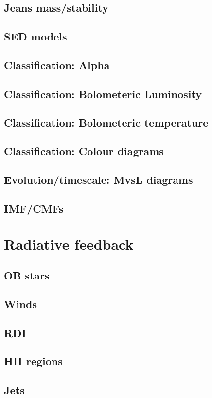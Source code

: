 \subsection{Jeans mass/stability}
\subsection{SED models}
\subsection{Classification: Alpha}
\subsection{Classification: Bolometeric Luminosity}
\subsection{Classification: Bolometeric temperature}
\subsection{Classification: Colour diagrams}
\subsection{Evolution/timescale: MvsL diagrams}
\subsection{IMF/CMFs}

\section{Radiative feedback}
\subsection{OB stars}
\subsection{Winds}
\subsection{RDI}
\subsection{HII regions}
\subsection{Jets}
